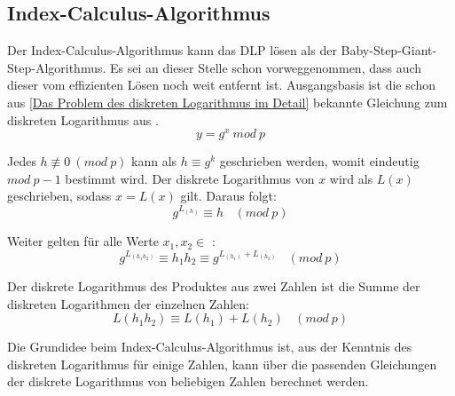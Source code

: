 	\subsection{Index-Calculus-Algorithmus}
		Der Index-Calculus-Algorithmus kann das DLP  lösen als der Baby-Step-Giant-Step-Algorithmus. Es sei an dieser Stelle schon vorweggenommen, dass auch dieser vom effizienten Lösen noch weit entfernt ist. Ausgangsbasis ist die schon aus \ref{Das Problem des diskreten Logarithmus im Detail} bekannte Gleichung  zum diskreten Logarithmus aus \myZPStern.
		\begin{equation}
			y = g^x~mod~p
			\label{Gleichung Diskreten Logarithmus aus ZPStern}
		\end{equation}
		
		Jedes $h \not\equiv 0~(mod~p)$ kann als $h \equiv g^k$ geschrieben werden, womit eindeutig $mod~p - 1$ bestimmt wird. Der diskrete Logarithmus von $x$ wird als $L(x)$ geschrieben, sodass $x = L(x)$ gilt. Daraus folgt:
		\begin{equation}
			g^{L_{(h)}} \equiv h~~~~(mod~p)
			\label{Gleichung Diskreten Logarithmus äquivalent}
		\end{equation}
		
		Weiter gelten für alle Werte $x_1, x_2 \in$ \myZPStern:
		\begin{equation}
			g^{L_{(h_1 h_2)}} \equiv h_1 h_2 \equiv g^{L_{(h_1)} + L_{(h_2)}}~~~~(mod~p)
		\end{equation}
		
		Der diskrete Logarithmus des Produktes aus zwei Zahlen ist die Summe der diskreten Logarithmen der einzelnen Zahlen:
		\begin{equation}
			L(h_1 h_2) \equiv L(h_1) + L(h_2)~~~~(mod~p)
			\label{Gleichung Diskreten Logarithmus additionSubtraktion}
		\end{equation}
		
		Die Grundidee beim Index-Calculus-Algorithmus ist, aus der Kenntnis des diskreten Logarithmus für einige Zahlen, kann über die passenden Gleichungen der diskrete Logarithmus von beliebigen Zahlen berechnet werden.\cite{DLP:ECDLP:Probleme:und:Loesungen}
		
